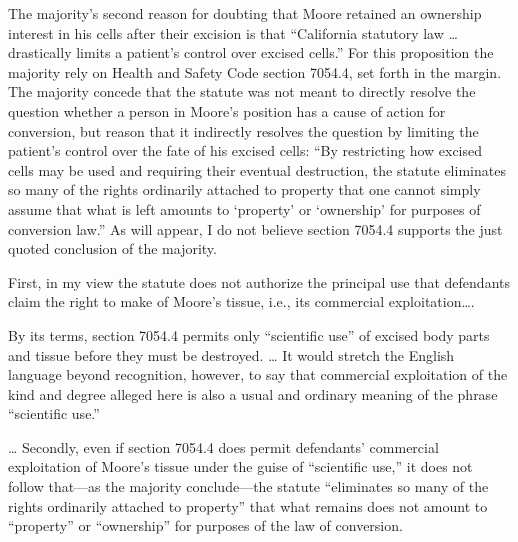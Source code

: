 The majority's second reason for doubting that Moore retained an ownership
interest in his cells after their excision is that ``California statutory law 
{\dots}  drastically limits a patient's control over excised cells.'' For this
proposition the majority rely on Health and Safety Code section 7054.4, set
forth in the margin. The majority
concede that the statute was not meant to directly resolve the question whether
a person in Moore's position has a cause of action for conversion, but reason
that it indirectly resolves the question by limiting the patient's control over
the fate of his excised cells: ``By restricting how excised cells may be used
and requiring their eventual destruction, the statute eliminates so many of the
rights ordinarily attached to property that one cannot simply assume that what
is left amounts to `property' or `ownership' for purposes of conversion law.''
As will appear, I do not believe section 7054.4 supports the just quoted
conclusion of the majority.

First, in my view the statute does not authorize the principal use that
defendants claim the right to make of Moore's tissue, i.e., its commercial
exploitation{\dots}.

By its terms, section 7054.4 permits only ``scientific use'' of excised body
parts and tissue before they must be destroyed. {\dots} It would stretch the
English language beyond recognition, however, to say that commercial
exploitation of the kind and degree alleged here is also a usual and ordinary
meaning of the phrase ``scientific use.''

{\dots} Secondly, even if section 7054.4 does permit defendants' commercial
exploitation of Moore's tissue under the guise of ``scientific use,'' it does
not follow that---as the majority conclude---the statute ``eliminates so many
of the rights ordinarily attached to property'' that what remains does not
amount to ``property'' or ``ownership'' for purposes of the law of conversion. 

